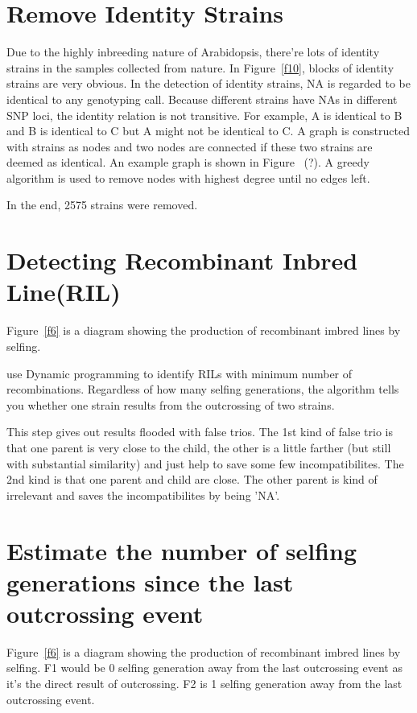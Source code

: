\documentclass[a4paper,10pt]{article}
\begin{document}
\section{Remove Identity Strains}
Due to the highly inbreeding nature of Arabidopsis, there're lots of identity strains in the samples collected from nature. In Figure~\ref{f10}, blocks of identity strains are very obvious. In the detection of identity strains, NA is regarded to be identical to any genotyping call. Because different strains have NAs in different SNP loci, the identity relation is not transitive. For example, A is identical to B and B is identical to C but A might not be identical to C. A graph is constructed with strains as nodes and two nodes are connected if these two strains are deemed as identical. An example graph is shown in Figure ~(?). A greedy algorithm is used to remove nodes with highest degree until no edges left.

In the end, 2575 strains were removed.

\section{Detecting Recombinant Inbred Line(RIL)}
Figure~\ref{f6} is a diagram showing the production of recombinant imbred lines by selfing.

use Dynamic programming to identify RILs with minimum number of recombinations. Regardless of how many selfing generations, the algorithm tells you whether one strain results from the outcrossing of two strains.

This step gives out results flooded with false trios. The 1st kind of false trio is that one parent is very close to the child, the other is a little farther (but still with substantial similarity) and just help to save some few incompatibilites. The 2nd kind is that one parent and child are close. The other parent is kind of irrelevant and saves the incompatibilites by being 'NA'.

\section{Estimate the number of selfing generations since the last outcrossing event}
Figure~\ref{f6} is a diagram showing the production of recombinant imbred lines by selfing. F1 would be 0 selfing generation away from the last outcrossing event as it's the direct result of outcrossing. F2 is 1 selfing generation away from the last outcrossing event.
\end{document}
